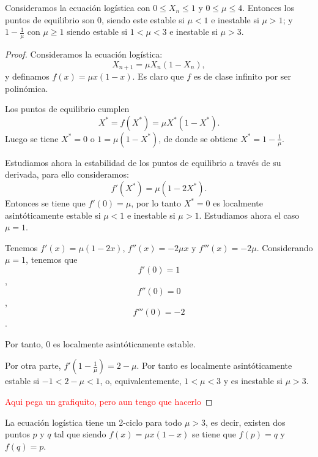 \begin{proposition}
Consideramos la ecuación logística con $0\leq X_n\leq 1$ y $0\leq\mu\leq 4$. Entonces los puntos de equilibrio son $0$, siendo este estable si $\mu < 1$ e inestable si $\mu > 1$; y $1-\frac{1}{\mu}$ con $\mu\geq 1$ siendo estable si $1<\mu<3$ e inestable si $\mu > 3$.
\end{proposition}
\begin{proof}
Consideramos la ecuación logística:
$$X_{n+1} = \mu X_n(1-X_n),$$
y definamos $f(x)=\mu x(1-x)$. Es claro que $f$ es de clase infinito por ser polinómica.

Los puntos de equilibrio cumplen
$$X^*=f(X^*)=\mu X^*(1-X^*).$$
Luego se tiene $X^*=0$ o $1=\mu (1-X^*)$, de donde se obtiene $X^*=1-\frac{1}{\mu}$.

Estudiamos ahora la estabilidad de los puntos de equilibrio a través de su derivada, para ello consideramos:
$$f'(X^*)=\mu (1-2X^*).$$
Entonces se tiene que $f'(0)=\mu$, por lo tanto $X^*=0$ es localmente asintóticamente estable si $\mu < 1$ e inestable si $\mu > 1$. Estudiamos ahora el caso $\mu = 1$.

Tenemos $f'(x)=\mu (1-2x)$, $f''(x)=-2\mu x$ y $f'''(x)=-2\mu$. Considerando $\mu =1$, tenemos que
$$f'(0)=1$$,
$$f''(0)=0$$,
$$f'''(0)=-2$$.

Por tanto, $0$ es localmente asintóticamente estable.

Por otra parte, $f'\left(1-\frac{1}{\mu}\right) = 2-\mu$. Por tanto es localmente asintóticamente estable si $-1<2-\mu<1$, o, equivalentemente, $1<\mu < 3$ y es inestable si $\mu > 3$.

\textcolor{red}{Aqui pega un grafiquito, pero aun tengo que hacerlo}

\end{proof}

\begin{proposition}
La ecuación logística tiene un 2-ciclo para todo $\mu > 3$, es decir, existen dos puntos $p$ y $q$ tal que siendo $f(x)=\mu x(1-x)$ se tiene que $f(p)=q$ y $f(q)=p$.
\end{proposition}

